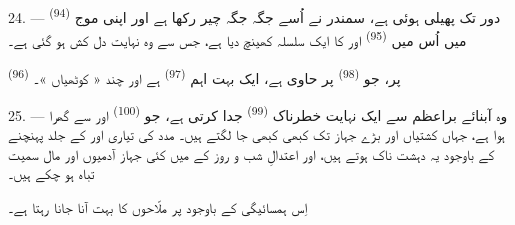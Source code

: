 \VUsaut{3.0mm}
\VUsaut{3.0mm}

24. ---  \textsuperscript{(94)} دور تک پھیلی ہوئی
ہے، سمندر نے اُسے جگہ جگہ چیر رکھا ہے اور اپنی موج میں اُس میں
 \textsuperscript{(95)} اور  کا ایک
سلسلہ کھینچ دیا ہے، جس سے وہ نہایت دل کش ہو گئی ہے۔

 \textsuperscript{(96)} پر، جو 
\textsuperscript{(98)} پر حاوی ہے، ایک بہت اہم 
\textsuperscript{(97)} ہے اور چند « کوٹھیاں »۔

25. --- وہ آبنائے براعظم سے ایک نہایت خطرناک 
\textsuperscript{(99)} جدا کرتی ہے، جو 
\textsuperscript{(100)} اور  سے گھرا ہوا ہے، جہاں
کشتیاں اور بڑے جہاز تک کبھی کبھی جا لگتے ہیں۔ مدد کی تیاری اور
 کے جلد پہنچنے کے باوجود یہ  دہشت ناک ہوتے ہیں، اور اعتدالِ شب و روز کے 
میں کئی جہاز آدمیوں اور مال سمیت تباہ ہو چکے ہیں۔

اِس ہمسائیگی کے باوجود  پر ملّاحوں کا بہت آنا جانا
رہتا ہے۔

\VUsaut{6.0mm}
\VUfilet{22mm}
